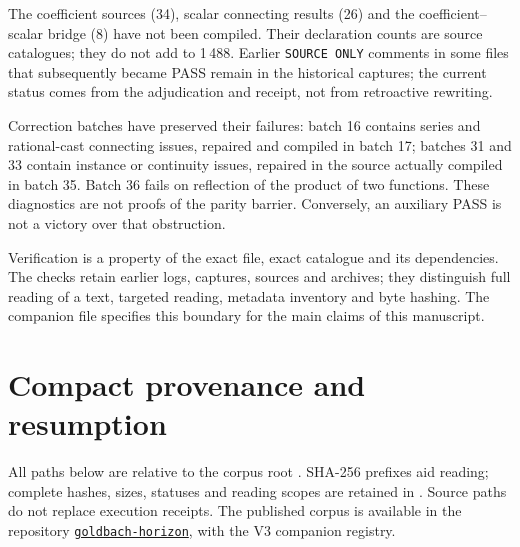 \documentclass[11pt,a4paper]{article}
\theoremstyle{remark}
\begin{document}
The coefficient sources (34), scalar connecting results (26) and the
coefficient--scalar bridge (8) have not been compiled. Their declaration
counts are source catalogues; they do not add to
1\,488. Earlier \texttt{SOURCE ONLY} comments in some
files that subsequently became PASS remain in the historical captures; the current
status comes from the adjudication and receipt, not from retroactive rewriting.

Correction batches have preserved their failures: batch 16 contains
series and rational-cast connecting issues, repaired and compiled
in batch 17; batches 31 and 33 contain instance
or continuity issues, repaired in the source actually compiled in batch
35. Batch 36 fails on reflection of the product of two functions.
These diagnostics are not proofs of the parity barrier. Conversely,
an auxiliary PASS is not a victory over that obstruction.

Verification is a property of the exact file, exact catalogue
and its dependencies. The checks retain earlier logs,
captures, sources and archives; they distinguish full reading of a
text, targeted reading, metadata inventory and byte hashing.
The companion file  specifies this boundary
for the main claims of this manuscript.

\clearpage
\appendix
\section{Compact provenance and resumption}\label{app:provenance}
All paths below are relative to the corpus root
. SHA-256 prefixes aid reading;
complete hashes, sizes, statuses and reading scopes are
retained in . Source paths
do not replace execution receipts.
The published corpus is available in the repository
\href{https://github.com/seisner1967-hash/goldbach-horizon}{\texttt{goldbach-horizon}},
with the V3 companion registry.
\end{document}
